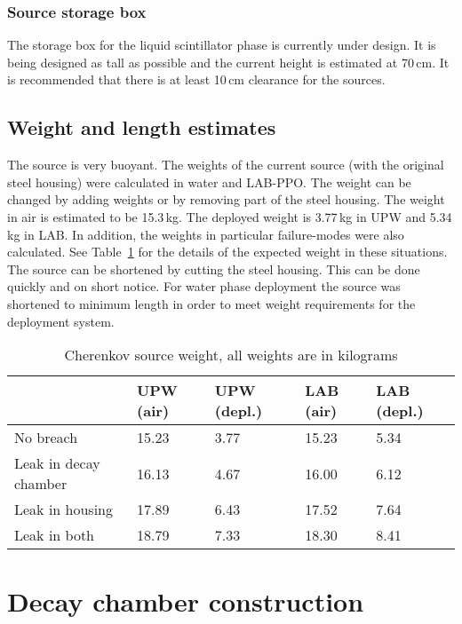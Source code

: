 \subsubsection{Source storage box}
The storage box for the liquid scintillator phase is currently under design. It is being designed as tall as possible and the current height is estimated at 70\,cm. It is recommended that there is at least 10\,cm clearance for the sources.
\subsection{Weight and length estimates}
The source is very buoyant. The weights of the current source (with the original steel housing) were calculated in water and LAB-PPO. The weight can be changed by adding weights or by removing part of the steel housing. The weight in air is estimated to be 15.3\,kg. The deployed weight is 3.77\,kg in UPW and 5.34\,kg in LAB. In addition, the weights in particular failure-modes were also calculated. See Table~\ref{tab:weights} for the details of the expected weight in these situations.
The source can be shortened by cutting the steel housing. This can be done quickly and on short notice. For water phase deployment the source was shortened to minimum length in order to meet weight requirements for the deployment system. 

\begin{table}[h!]
\centering
\begin{tabular}{|l|l|l|l|l|} \hline
                & UPW (air)     & UPW (depl.)   & LAB (air)     & LAB (depl.)   \\ \hline
No breach       & 15.23         & 3.77              & 15.23         & 5.34              \\ \hline
Leak in
decay chamber   & 16.13         & 4.67              & 16.00         & 6.12              \\ \hline
Leak in
housing         & 17.89         & 6.43              & 17.52         & 7.64              \\ \hline
Leak in
both          & 18.79         & 7.33              & 18.30         & 8.41              \\ \hline
\end{tabular}
\caption{\label{tab:weights} Cherenkov source weight, all weights are in kilograms}
\end{table}

\section{Decay chamber construction}
\label{chap:construction}

